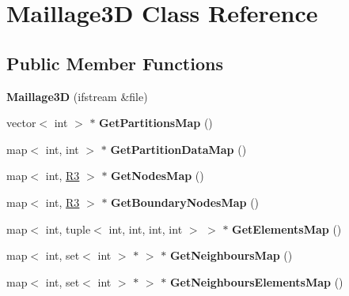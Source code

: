\hypertarget{class_maillage3_d}{}\section{Maillage3D Class Reference}
\label{class_maillage3_d}
\subsection*{Public Member Functions}
\begin{DoxyCompactItemize}
\item 
{\bfseries Maillage3D} (ifstream \&file)\hypertarget{class_maillage3_d_a4cb644d6eb850e43cedbf76d6a0c7670}{}\label{class_maillage3_d_a4cb644d6eb850e43cedbf76d6a0c7670}

\item 
vector$<$ int $>$ $\ast$ {\bfseries Get\+Partitions\+Map} ()\hypertarget{class_maillage3_d_a67233581efb7b8c3871e6e790c194ad0}{}\label{class_maillage3_d_a67233581efb7b8c3871e6e790c194ad0}

\item 
map$<$ int, int $>$ $\ast$ {\bfseries Get\+Partition\+Data\+Map} ()\hypertarget{class_maillage3_d_a39d95905ed37c2648c823a8b1cf49201}{}\label{class_maillage3_d_a39d95905ed37c2648c823a8b1cf49201}

\item 
map$<$ int, \hyperlink{class_r3}{R3} $>$ $\ast$ {\bfseries Get\+Nodes\+Map} ()\hypertarget{class_maillage3_d_ac9fb51e0a9321c7517c034933fa7784b}{}\label{class_maillage3_d_ac9fb51e0a9321c7517c034933fa7784b}

\item 
map$<$ int, \hyperlink{class_r3}{R3} $>$ $\ast$ {\bfseries Get\+Boundary\+Nodes\+Map} ()\hypertarget{class_maillage3_d_a0d2839624de6ccc1c875a9ead1877dfc}{}\label{class_maillage3_d_a0d2839624de6ccc1c875a9ead1877dfc}

\item 
map$<$ int, tuple$<$ int, int, int, int $>$ $>$ $\ast$ {\bfseries Get\+Elements\+Map} ()\hypertarget{class_maillage3_d_a1b6ae9e950380f2b7e8fae2b229779e6}{}\label{class_maillage3_d_a1b6ae9e950380f2b7e8fae2b229779e6}

\item 
map$<$ int, set$<$ int $>$ $\ast$ $>$ $\ast$ {\bfseries Get\+Neighbours\+Map} ()\hypertarget{class_maillage3_d_aa2adbe2eacaa1fc937bc649c044a6ce3}{}\label{class_maillage3_d_aa2adbe2eacaa1fc937bc649c044a6ce3}

\item 
map$<$ int, set$<$ int $>$ $\ast$ $>$ $\ast$ {\bfseries Get\+Neighbours\+Elements\+Map} ()\hypertarget{class_maillage3_d_a9128a84b0d0490426f1686625cc1b96e}{}\label{class_maillage3_d_a9128a84b0d0490426f1686625cc1b96e}


\end{DoxyCompactItemize}
